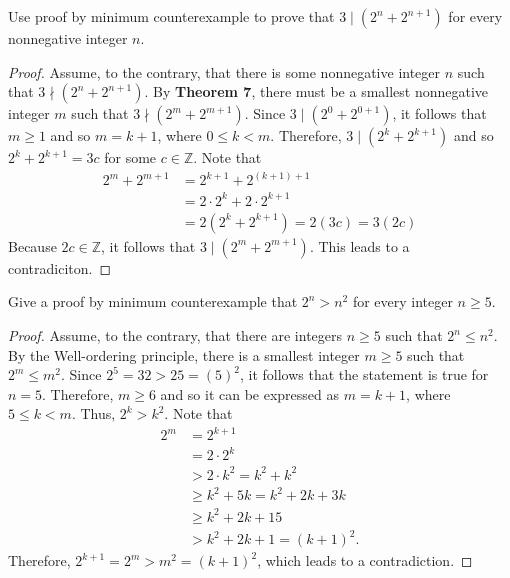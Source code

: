 \documentclass[12pt]{article}
\newcommand{\Z}{\mathbb{Z}}
\newenvironment{problem}[2][Problem]{\begin{trivlist}
		\item[\hskip \labelsep {\bfseries #1}\hskip \labelsep {\bfseries #2.}]}{\end{trivlist}}
\begin{document}
\begin{problem}{37}
	Use proof by minimum counterexample to prove that $3\mid \left(2^{n}+2^{n+1}\right)$ for every nonnegative integer $n$.
	\begin{proof}
		Assume, to the contrary, that there is some nonnegative integer $n$ such that $3\nmid \left(2^{n}+2^{n+1}\right)$. By \textbf{Theorem 7}, there must be a smallest nonnegative integer $m$ such that $3\nmid \left(2^{m}+2^{m+1}\right)$. Since $3\mid \left(2^{0}+2^{0+1}\right)$, it follows that $m\geq 1$ and so $m = k+1$, where $0\leq k < m$. Therefore, $3\mid \left(2^{k}+2^{k+1}\right)$ and so $2^{k}+2^{k+1} = 3c$ for some $c\in \Z$. Note that
		\begin{align*}
			2^{m} + 2^{m+1} &= 2^{k+1}+2^{(k+1)+1}\\
			&= 2\cdot 2^{k} + 2\cdot 2^{k+1}\\
			&= 2\left(2^{k}+2^{k+1}\right) = 2(3c) = 3(2c)
		\end{align*} 
	Because $2c \in \Z$, it follows that $3\mid \left(2^{m}+2^{m+1}\right)$. This leads to a contradiciton.
	\end{proof}
\end{problem} 

\begin{problem}{38}
	Give a proof by minimum counterexample that $2^{n} > n^{2}$ for every integer $n\geq 5$.
	\begin{proof}
		Assume, to the contrary, that there are integers $n\geq 5$ such that $2^{n} \leq n^{2}$. By the Well-ordering principle, there is a smallest integer $m\geq 5$ such that $2^{m} \leq m^{2}$. Since $2^{5} = 32 > 25 = (5)^{2}$, it follows that the statement is true for $n=5$. Therefore, $m \geq 6$ and so it can be expressed as $m=k+1$, where $5\leq k < m$. Thus, $2^{k} > k^{2}$. Note that
		\begin{align*}
			2^{m} &= 2^{k+1}\\
			&= 2\cdot 2^{k}\\
			&> 2\cdot k^{2} = k^{2} + k^{2}\\
			&\geq k^{2} + 5k = k^{2} + 2k + 3k\\
			&\geq k^{2} + 2k + 15 \\
			&> k^{2} +2k +1 = (k+1)^{2}.
		\end{align*}  
	Therefore, $ 2^{k+1} = 2^{m} > m^{2} = (k+1)^{2}$, which leads to a contradiction.
	\end{proof}
\end{problem}
\end{document}
